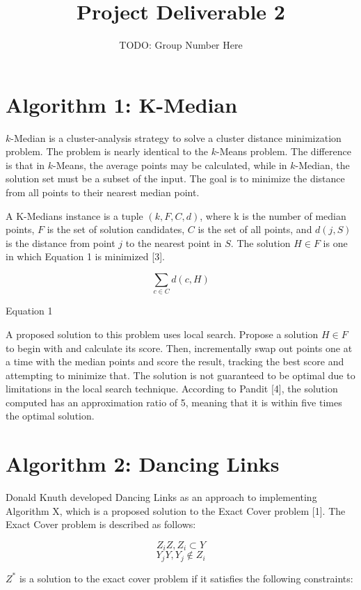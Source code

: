 \documentclass[11pt]{article}
\title{Project Deliverable 2}
\author{TODO: Group Number Here}
\begin{document}
\maketitle

\section*{Algorithm 1: K-Median}

$k$-Median is a cluster-analysis strategy to solve a cluster distance minimization problem. The problem is nearly identical to the $k$-Means problem. The difference is that in $k$-Means, the average points may be calculated, while in $k$-Median, the solution set must be a subset of the input. The goal is to minimize the distance from all points to their nearest median point.

A K-Medians instance is a tuple $(k,F,C,d)$, where k is the number of median points, $F$ is the set of solution candidates, $C$ is the set of all points, and $d(j,S)$ is the distance from point $j$ to the nearest point in $S$. The solution $H \in F$ is one in which Equation 1 is minimized [3].

$$\sum_{c \in C} d(c,H)$$

\begin{center}
    Equation 1
\end{center}

A proposed solution to this problem uses local search. Propose a solution $H \in F$ to begin with and calculate its score. Then, incrementally swap out points one at a time with the median points and score the result, tracking the best score and attempting to minimize that. The solution is not guaranteed to be optimal due to limitations in the local search technique. According to Pandit [4], the solution computed has an approximation ratio of 5, meaning that it is within five times the optimal solution.

\section*{Algorithm 2: Dancing Links}

Donald Knuth developed Dancing Links as an approach to implementing Algorithm X, which is a proposed solution to the Exact Cover problem [1]. The Exact Cover problem is described as follows:

$$Z_iZ, Z_i \subset Y$$
$$Y_jY, Y_j \notin Z_i$$

$Z^{\ast}$ is a solution to the exact cover problem if it satisfies the following constraints:
\end{document}
